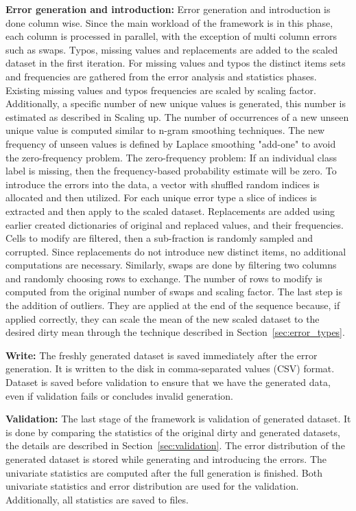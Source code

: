 \textbf{Error generation and introduction:} 
Error generation and introduction is done column wise. 
Since the main workload of the framework is in this phase, each column is processed in parallel, with the exception of multi column errors such as swaps.
Typos, missing values and replacements are added to the scaled dataset in the first iteration.
For missing values and typos the distinct items sets and frequencies are gathered from the error analysis and statistics phases. 
Existing missing values and typos frequencies are scaled by scaling factor. Additionally, a specific number of new unique values is generated, this number is estimated as described in Scaling up.
The number of occurrences of a new unseen unique value is computed similar to n-gram smoothing techniques. 
The new frequency of unseen values is defined by Laplace smoothing "add-one" to avoid the zero-frequency problem.
The zero-frequency problem: If an individual class label is missing, then the frequency-based probability estimate will be zero.
To introduce the errors into the data, a vector with shuffled random indices is allocated and then utilized. 
For each unique error type a slice of indices is extracted and then apply to the scaled dataset.
Replacements are added using earlier created dictionaries of original and replaced values, and their frequencies.
Cells to modify are filtered, then a sub-fraction is randomly sampled and corrupted.
Since replacements do not introduce new distinct items, no additional computations are necessary. 
Similarly, swaps are done by filtering two columns and randomly choosing rows to exchange. 
The number of rows to modify is computed from the original number of swaps and scaling factor.
The last step is the addition of outliers. 
They are applied at the end of the sequence because, if applied correctly, they can scale the mean of the new scaled dataset to the desired dirty mean through the technique described in Section~\ref{sec:error_types}. 


\textbf{Write:}  
The freshly generated dataset is saved immediately after the error generation. It is written to the disk in comma-separated values (CSV) format. 
Dataset is saved before validation to ensure that we have the generated data, even if validation fails or concludes invalid generation.


\textbf{Validation:} 
The last stage of the framework is validation of generated dataset. It is done by comparing the statistics of the original dirty and generated datasets, the details are described in Section~\ref{sec:validation}.
The error distribution of the generated dataset is stored while generating and introducing the errors.
The univariate statistics are computed after the full generation is finished.
Both univariate statistics and error distribution are used for the validation. 
Additionally, all statistics are saved to files.

